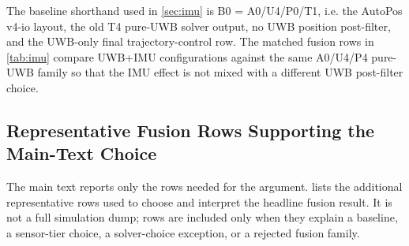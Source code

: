 \documentclass[11pt,a4paper]{article}
\begin{document}
The baseline shorthand used in \cref{sec:imu} is B0 = A0/U4/P0/T1, i.e. the AutoPos v4-io layout, the old T4 pure-UWB solver output, no UWB position post-filter, and the UWB-only final trajectory-control row.
The matched fusion rows in \cref{tab:imu} compare UWB+IMU configurations against the same A0/U4/P4 pure-UWB family so that the IMU effect is not mixed with a different UWB post-filter choice.

\subsection{Representative Fusion Rows Supporting the Main-Text Choice}
\label{app:imu_representative_rows}

The main text reports only the rows needed for the argument.
 lists the additional representative rows used to choose and interpret the headline fusion result.
It is not a full simulation dump; rows are included only when they explain a baseline, a sensor-tier choice, a solver-choice exception, or a rejected fusion family.
\end{document}
